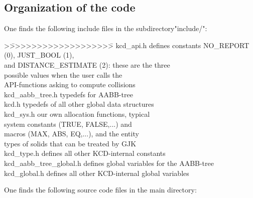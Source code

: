 \subsection{Organization of the code}
One finds the following include files in the subdirectory"include/":
\begin{tabbing}
\vspace{-5mm}
>\=>>>>>>>>>>>>>>>>>>>\= \kill
\>kcd\_api.h               \>      defines constants NO\_REPORT (0), JUST\_BOOL (1),\\
\>\>                               and DISTANCE\_ESTIMATE (2): these are the three\\
\>\>                               possible values when the user calls the \\
\>\>                               API-functions asking to compute collisions\\
\>kcd\_aabb\_tree.h           \>     typedefs for AABB-tree \\
\>kcd.h                       \>   typedefs of all other global data structures\\
\>kcd\_sys.h                  \>    our own allocation functions, typical \\
\>\>                               system constants (TRUE, FALSE,...) and \\
\>\>                               macros (MAX, ABS, EQ,...), and the entity\\
\>\>                               types of solids that can be treated by GJK\\
\>kcd\_type.h                    \> defines all other KCD-internal constants\\
\>kcd\_aabb\_tree\_global.h      \>   defines global variables for the AABB-tree\\
\>kcd\_global.h                  \> defines all other KCD-internal global variables
\vspace{-4mm}
\end{tabbing}
One finds the following source code files in the main directory:
